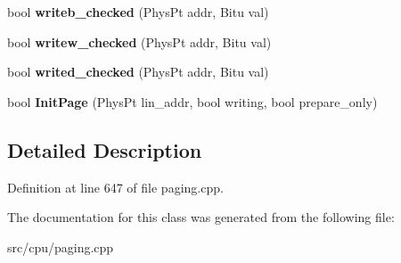\begin{DoxyCompactItemize}
\item 
\hypertarget{classNewInitPageHandler_a342ecdf4f9a89943a737464c4f86012e}{bool {\bfseries writeb\-\_\-checked} (Phys\-Pt addr, Bitu val)}\label{classNewInitPageHandler_a342ecdf4f9a89943a737464c4f86012e}

\item 
\hypertarget{classNewInitPageHandler_a03301e03d6dc87b05c36b29685b30d92}{bool {\bfseries writew\-\_\-checked} (Phys\-Pt addr, Bitu val)}\label{classNewInitPageHandler_a03301e03d6dc87b05c36b29685b30d92}

\item 
\hypertarget{classNewInitPageHandler_a192d6438cfe0114d22a2fb7f3329600a}{bool {\bfseries writed\-\_\-checked} (Phys\-Pt addr, Bitu val)}\label{classNewInitPageHandler_a192d6438cfe0114d22a2fb7f3329600a}

\item 
\hypertarget{classNewInitPageHandler_a1ed4fb6bc908d2a5b4a8c0b486be0852}{bool {\bfseries Init\-Page} (Phys\-Pt lin\-\_\-addr, bool writing, bool prepare\-\_\-only)}\label{classNewInitPageHandler_a1ed4fb6bc908d2a5b4a8c0b486be0852}

\end{DoxyCompactItemize}


\subsection{Detailed Description}


Definition at line 647 of file paging.\-cpp.



The documentation for this class was generated from the following file\-:\begin{DoxyCompactItemize}
\item 
src/cpu/paging.\-cpp\end{DoxyCompactItemize}
